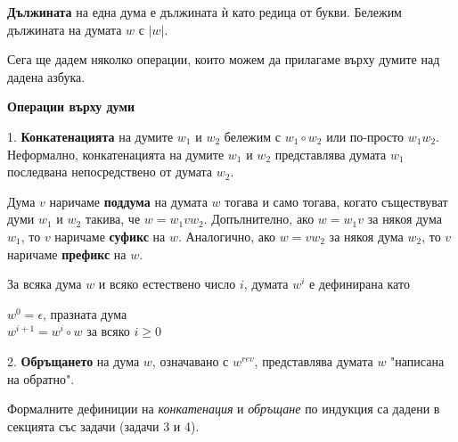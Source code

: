 \documentclass[openany]{book}
\begin{document}
    \textbf{Дължината} на една дума е дължината ѝ като редица от букви. 
    Бележим дължината на думата $w$ с $|w|$.

    \vspace{30pt}
    
    \hspace{15pt} Сега ще дадем няколко операции, които можем да прилагаме върху думите
    над дадена азбука.

    \newpage

    \textbf{Операции върху думи} \\

    \vspace{5pt}
    
    1. \textbf{Конкатенацията} на думите $w_1$ и $w_2$ бележим с 
    $w_1 \circ w_2$ или по-просто $w_1w_2$. Неформално, конкатенацията
    на думите $w_1$ и $w_2$ представлява думата $w_1$ последвана непосредствено
    от думата $w_2$.

    \vspace{5pt}

    Дума $v$ наричаме \textbf{поддума} на думата $w$ тогава и само тогава,
    когато съществуват думи $w_1$ и $w_2$ такива, че $w = w_1vw_2$. Допълнително,
    ако $w = w_1v$ за някоя дума $w_1$, то $v$ наричаме \textbf{суфикс} на $w$. Аналогично, ако
    $w = vw_2$ за някоя дума $w_2$, то $v$ наричаме \textbf{префикс} на $w$.

    \vspace{5pt}

    За всяка дума $w$ и всяко естествено число $i$, думата $w^i$ е дефинирана
    като 

    \begin{center}
        $w^0 = \epsilon$, празната дума \\
        $w^{i+1} = w^i \circ w$ за всяко $i \geq 0$
    \end{center}

    \vspace{5pt}

    2. \textbf{Обръщането} на дума $w$, означавано с $w^{rev}$, представлява
    думата $w$ "написана на обратно". 

    \vspace{5pt}

    Формалните дефиниции на \textit{конкатенация} и \textit{обръщане} по индукция са
    дадени в секцията със задачи (задачи 3 и 4).
    
    \vspace{15pt}
\end{document}
